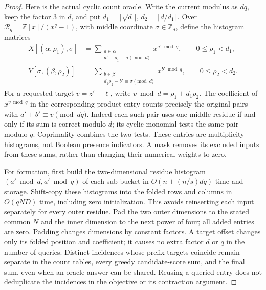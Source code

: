 \documentclass[11pt]{article}
\begin{document}
\begin{proof}
Here is the actual cyclic count oracle.  Write the current modulus
as $dq$, keep the factor $3$ in $d$, and put
$d_1=\lceil\sqrt d\rceil$, $d_2=\lceil d/d_1\rceil$.
Over $\mathcal R_q=\mathbb Z[x]/(x^q-1)$, with middle coordinate
$\sigma\in\mathbb Z_d$, define the histogram matrices
\begin{align*}
 X[(\alpha,\rho_1),\sigma]
 &=\sum_{\substack{a\in\alpha\\a'-\rho_1\equiv\sigma\pmod d}}
             x^{a'\bmod q},\qquad 0\le\rho_1<d_1,\\
 Y[\sigma,(\beta,\rho_2)]
 &=\sum_{\substack{b\in\beta\\d_1\rho_2-b'\equiv\sigma\pmod d}}
             x^{b'\bmod q},\qquad 0\le\rho_2<d_2.
\end{align*}
For a requested target $v=z'+\ell$, write
$v\bmod d=\rho_1+d_1\rho_2$.  The coefficient of $x^{v\bmod q}$
in the corresponding product entry counts precisely the original
pairs with $a'+b'\equiv v\pmod{dq}$.  Indeed each such pair uses one
middle residue if and only if its sum is correct modulo $d$; its
cyclic monomial tests the same pair modulo $q$.  Coprimality combines
the two tests.  These entries are multiplicity histograms, not Boolean
presence indicators.  A mask removes its excluded inputs from these
sums, rather than changing their numerical weights to zero.

For formation, first build the two-dimensional residue histogram
$(a'\bmod d,a'\bmod q)$ of each sub-bucket in
$O(n+(n/s)dq)$ time and storage.  Shift-copy these histograms into the
folded rows and columns in $O(qND)$ time, including zero initialization.
This avoids reinserting each input separately for every outer residue.
Pad the two outer dimensions to the stated common $N$ and the inner
dimension to the next power of four; all added entries are zero.
Padding changes dimensions by constant factors.  A target offset
changes only its folded position and coefficient; it causes no extra
factor $d$ or $q$ in the number of queries.  Distinct incidences whose
prefix targets coincide remain separate in the count tables, every
greedy candidate-score sum, and the final sum, even when an oracle
answer can be shared.  Reusing a queried entry does not deduplicate
the incidences in the objective or its contraction argument.
\end{proof}
\end{document}
